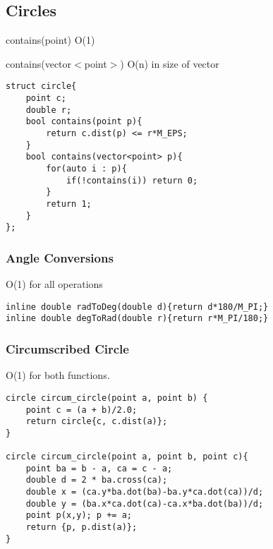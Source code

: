 \documentclass[10pt]{article}{\twocolumn}
\begin{document}
\subsection{Circles}
contains(point) O(1)

\noindent contains(vector$<$point$>$) O(n) in size of vector
\begin{lstlisting}
struct circle{
    point c;
    double r;
    bool contains(point p){
        return c.dist(p) <= r*M_EPS;
    }
    bool contains(vector<point> p){
        for(auto i : p){
            if(!contains(i)) return 0;
        }
        return 1;
    }
};
\end{lstlisting}
\subsubsection{Angle Conversions}
O(1) for all operations
\begin{lstlisting}
inline double radToDeg(double d){return d*180/M_PI;}
inline double degToRad(double r){return r*M_PI/180;}
\end{lstlisting}

\subsubsection{Circumscribed Circle}
O(1) for both functions.
\begin{lstlisting}
circle circum_circle(point a, point b) {
	point c = (a + b)/2.0;
	return circle{c, c.dist(a)};
}

circle circum_circle(point a, point b, point c){
    point ba = b - a, ca = c - a;
    double d = 2 * ba.cross(ca);
	double x = (ca.y*ba.dot(ba)-ba.y*ca.dot(ca))/d;
	double y = (ba.x*ca.dot(ca)-ca.x*ba.dot(ba))/d;
	point p(x,y); p += a;
	return {p, p.dist(a)};
}
\end{lstlisting}
\end{document}

